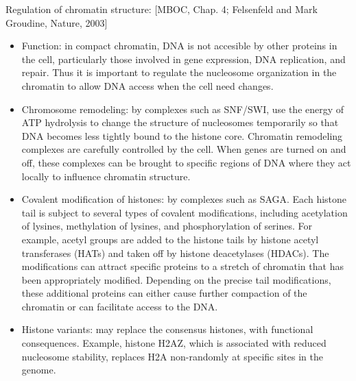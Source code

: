 \documentclass{report}
\begin{document}
Regulation of chromatin structure: [MBOC, Chap. 4; Felsenfeld and Mark Groudine, Nature, 2003]
\begin{itemize}
\item Function: in compact chromatin, DNA is not accesible by other proteins in the cell, particularly those involved in gene expression, DNA replication, and repair. Thus it is important to regulate the nucleosome organization in the chromatin to allow DNA access when the cell need changes.
\item Chromosome remodeling: by complexes such as SNF/SWI, use the energy of ATP hydrolysis to change the structure of nucleosomes temporarily so that DNA becomes less tightly bound to the histone core. Chromatin remodeling complexes are carefully controlled by the cell. When genes are turned on and off, these complexes can be brought to specific regions of DNA where they act locally to influence chromatin structure.
\item Covalent modification of histones: by complexes such as SAGA. Each histone tail is subject to several types of covalent modifications, including acetylation of lysines, methylation of lysines, and phosphorylation of serines. For example, acetyl groups are added to the histone tails by histone acetyl transferases (HATs) and taken off by histone deacetylases (HDACs). The modifications can attract specific proteins to a stretch of chromatin that has been appropriately modified. Depending on the precise tail modifications, these additional proteins can either cause further compaction of the chromatin or can facilitate access to the DNA. 
\item Histone variants: may replace the consensus histones, with functional consequences. Example, histone H2AZ, which is associated with reduced nucleosome stability, replaces H2A non-randomly at specific sites in the genome.
\end{itemize}
\end{document}
